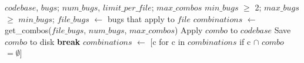 \begin{algorithm}
\begin{algorithmic}
\Require $codebase$, 
$bugs$; $num\_bugs$, $limit\_per\_file$; $max\_combos$
\Ensure $min\_bugs$ $\geq$ 2;
\State $max\_bugs$ $\geq$ $min\_bugs$;
    \State $file\_bugs$ $\gets$ bugs that apply to $file$
    \State $combinations$ $\gets$ get\_combos($file\_bugs$, $num\_bugs$, $max\_combos$)
        \State Apply $combo$ to $codebase$
            \State Save $combo$ to disk
                \State \textbf{break}
            \EndIf
            \State $combinations$ $\gets$ [c for c in $combinations$ if c $\cap$ $combo$ $=\emptyset$]
        \EndIf
    \EndFor
\EndFor
\EndProcedure
\end{algorithmic}
\caption{Combine multiple patches from the same file.}
\label{alg:combine_file}
\end{algorithm}